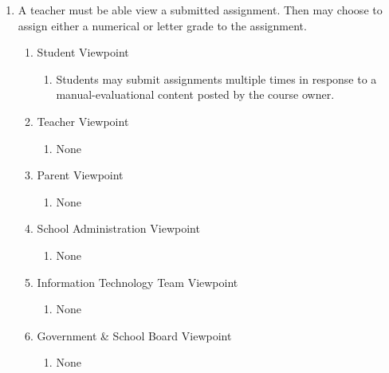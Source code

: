 \documentclass[]{article}
\begin{document}
\begin{enumerate}[{BE}1.]
	\item A teacher must be able view a submitted assignment. Then may choose to 
assign either a numerical or letter grade to the assignment.
	\begin{enumerate}[{VP2}.1]
		\item Student Viewpoint
			\begin{enumerate}
				\item Students may submit assignments multiple times in response to a 
manual-evaluational content posted by the course owner.
			\end{enumerate}
		\item Teacher Viewpoint
			\begin{enumerate}
				\item None
			\end{enumerate}
		\item Parent Viewpoint
			\begin{enumerate}
				\item None
			\end{enumerate}
		\item School Administration Viewpoint
			\begin{enumerate}
				\item None
			\end{enumerate}
		\item Information Technology Team Viewpoint
			\begin{enumerate}
				\item None
			\end{enumerate}
		\item Government \& School Board Viewpoint
			\begin{enumerate}
				\item None
			\end{enumerate}
	\end{enumerate}


\end{enumerate}
\end{document}
